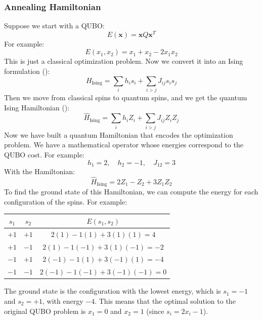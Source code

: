 \subsubsection{Annealing Hamiltonian}\label{sec:annealing-hamiltonian}

Suppose we start with a QUBO:
\begin{equation*}
    E(\mathbf{x}) = \mathbf{x} Q \mathbf{x}^T
\end{equation*}
For example:
\begin{equation*}
    E(x_1, x_2) = x_1 + x_2 - 2 x_1 x_2
\end{equation*}
This is just a classical optimization problem. Now we convert it into an Ising formulation ():
\begin{equation*}
    H_{\text{Ising}} = \sum_i h_i s_i + \sum_{i>j} J_{ij} s_i s_j
\end{equation*}
Then we move from classical spins to quantum spins, and we get the quantum Ising Hamiltonian ():
\begin{equation*}
    \hat{H}_{\text{Ising}} = \sum_i h_i Z_i + \sum_{i > j} J_{ij} Z_i Z_j
\end{equation*}
Now we have built a quantum Hamiltonian that encodes the optimization problem. We have a mathematical operator whose energies correspond to the QUBO cost. For example:
\begin{equation*}
    h_1 = 2, \quad h_2 = -1, \quad J_{12} = 3
\end{equation*}
With the Hamiltonian:
\begin{equation*}
    \hat{H}_{\text{Ising}} = 2 Z_1 - Z_2 + 3 Z_1 Z_2
\end{equation*}
To find the ground state of this Hamiltonian, we can compute the energy for each configuration of the spins. For example:
\begin{center}
    \begin{tabular}{@{} c c c @{}}
        \toprule
        $s_1$ & $s_2$ & $E(s_1, s_2)$ \\
        \midrule
        $+1$ & $+1$ & $2(1) - 1(1) + 3(1)(1) = 4$ \\
        $+1$ & $-1$ & $2(1) - 1(-1) + 3(1)(-1) = -2$ \\
        $-1$ & $+1$ & $2(-1) - 1(1) + 3(-1)(1) = -4$ \\
        $-1$ & $-1$ & $2(-1) - 1(-1) + 3(-1)(-1) = 0$ \\
        \bottomrule
    \end{tabular}
\end{center}
The ground state is the configuration with the lowest energy, which is $s_1 = -1$ and $s_2 = +1$, with energy $-4$. This means that the optimal solution to the original QUBO problem is $x_1 = 0$ and $x_2 = 1$ (since $s_i = 2 x_i - 1$).

